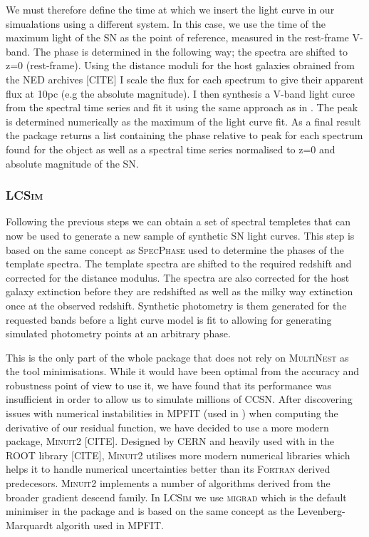 We must therefore define the time at which we insert the light curve in our simualations using a different system. In this case, we use the time of the maximum light of the SN as the point of reference, measured in the rest-frame V-band. The phase is determined in the following way; the spectra are shifted to z=0 (rest-frame). Using the distance moduli for the host galaxies obrained from the NED archives [CITE] I scale the flux for each spectrum to give their apparent flux at 10pc (e.g the absolute magnitude). I then synthesis a V-band light curce from the spectral time series and fit it using the same approach as in . The peak is determined numerically as the maximum of the light curve fit. As a final result the package returns a list containing the phase relative to peak for each spectrum found for the object as well as a spectral time series normalised to z=0 and absolute magnitude of the SN.

\subsubsection{\textsc{LCSim}}
Following the previous steps we can obtain a set of spectral templetes that can now be used to generate a new sample of synthetic SN light curves. This step is based on the same concept as \textsc{SpecPhase} used to determine the phases of the template spectra. The template spectra are shifted to the required redshift and corrected for the distance modulus. The spectra are also corrected for the host galaxy extinction before they are redshifted as well as the milky way extinction once at the observed redshift. Synthetic photometry is them generated for the requested bands before a light curve model is fit to allowing for generating simulated photometry points at an arbitrary phase.

This is the only part of the whole package that does not rely on \textsc{MultiNest} as the tool minimisations. While it would have been optimal from the accuracy and robustness point of view to use it, we have found that its performance was insufficient in order to allow us to simulate millions of CCSN. After discovering issues with numerical instabilities in \textsc{MPFIT} (used in ) when computing the derivative of our residual function, we have decided to use a more modern package, \textsc{Minuit2} [CITE]. Designed by CERN and heavily used with in the ROOT library [CITE], \textsc{Minuit2} utilises more modern numerical libraries which helps it to handle numerical uncertainties better than its \textsc{Fortran} derived predecesors. \textsc{Minuit2} implements a number of algorithms derived from the broader gradient descend family. In \textsc{LCSim} we use \textsc{migrad} which is the default minimiser in the package and is based on the same concept as the Levenberg-Marquardt algorith used in \textsc{MPFIT}.

